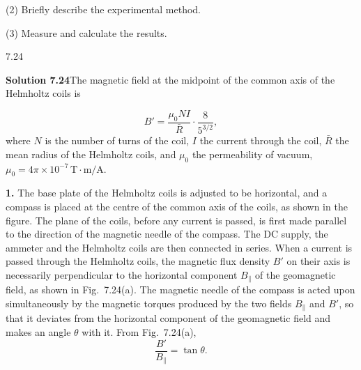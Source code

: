 (2) Briefly describe the experimental method.

(3) Measure and calculate the results.

\begin{figbox}{7.24}
\end{figbox}

\textbf{Solution 7.24}\quad The magnetic field at the midpoint of the common axis of the Helmholtz coils is

\[
B'=\frac{\mu_0NI}{\bar{R}}\cdot\frac{8}{5^{3/2}},
\]
where $N$ is the number of turns of the coil, $I$ the current through the coil, $\bar{R}$ the mean radius of the Helmholtz coils, and $\mu_0$ the permeability of vacuum, $\mu_0=4\pi\times10^{-7}\,\mathrm{T\cdot m/A}$.

\textbf{1.} The base plate of the Helmholtz coils is adjusted to be horizontal, and a compass is placed at the centre of the common axis of the coils, as shown in the figure. The plane of the coils, before any current is passed, is first made parallel to the direction of the magnetic needle of the compass. The DC supply, the ammeter and the Helmholtz coils are then connected in series. When a current is passed through the Helmholtz coils, the magnetic flux density $B'$ on their axis is necessarily perpendicular to the horizontal component $B_\parallel$ of the geomagnetic field, as shown in Fig.~7.24(a). The magnetic needle of the compass is acted upon simultaneously by the magnetic torques produced by the two fields $B_\parallel$ and $B'$, so that it deviates from the horizontal component of the geomagnetic field and makes an angle $\theta$ with it. From Fig.~7.24(a),
\begin{equation}
\frac{B'}{B_\parallel}=\tan\theta . \tag{1}
\end{equation}

